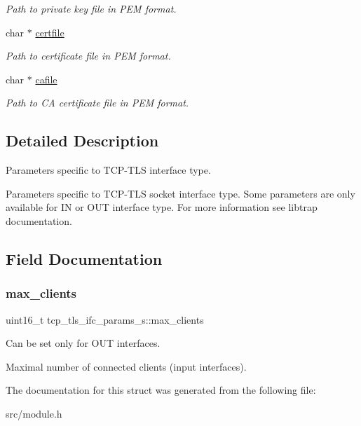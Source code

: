 \begin{DoxyCompactItemize}
\begin{DoxyCompactList}\small\item\em Path to private key file in P\+EM format. \end{DoxyCompactList}\item 
\mbox{\label{structtcp__tls__ifc__params__s_a4e8d298323febb0e149f3b922a459518}} 
char $\ast$ \hyperlink{structtcp__tls__ifc__params__s_a4e8d298323febb0e149f3b922a459518}{certfile}
\begin{DoxyCompactList}\small\item\em Path to certificate file in P\+EM format. \end{DoxyCompactList}\item 
\mbox{\label{structtcp__tls__ifc__params__s_a12ef39f155a7ac08fa347150cdd4eec8}} 
char $\ast$ \hyperlink{structtcp__tls__ifc__params__s_a12ef39f155a7ac08fa347150cdd4eec8}{cafile}
\begin{DoxyCompactList}\small\item\em Path to CA certificate file in P\+EM format. \end{DoxyCompactList}\end{DoxyCompactItemize}


\subsection{Detailed Description}
Parameters specific to T\+C\+P-\/\+T\+LS interface type. 

Parameters specific to T\+C\+P-\/\+T\+LS socket interface type. Some parameters are only available for IN or O\+UT interface type. For more information see libtrap documentation. 

\subsection{Field Documentation}
\mbox{\label{structtcp__tls__ifc__params__s_aa71bfab820fc8b16700bf6384270a9f6}} 
\subsubsection{\texorpdfstring{max\+\_\+clients}{max\_clients}}
{\footnotesize\ttfamily uint16\+\_\+t tcp\+\_\+tls\+\_\+ifc\+\_\+params\+\_\+s\+::max\+\_\+clients}



Can be set only for O\+UT interfaces. 

Maximal number of connected clients (input interfaces). 

The documentation for this struct was generated from the following file\+:\begin{DoxyCompactItemize}
\item 
src/module.\+h\end{DoxyCompactItemize}
